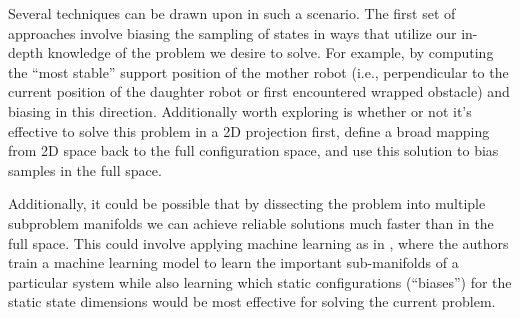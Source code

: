 \documentclass[12pt]{article}
\begin{document}
Several techniques can be drawn upon in such a scenario. The first set of approaches involve biasing the sampling of states 
in ways that utilize our in-depth knowledge of the problem we desire to solve. For example, by computing the ``most stable'' support 
position of the mother robot (i.e., perpendicular to the current position of the daughter robot or first encountered wrapped obstacle) 
and biasing in this direction. Additionally worth exploring is whether or not it's effective to solve this problem in 
a 2D projection first, define a broad mapping from 2D space back to the full configuration space, and use this solution to bias samples
in the full space. 

Additionally, it could be possible that by dissecting the problem into multiple subproblem manifolds we can achieve reliable 
solutions much faster than in the full space. This could involve applying machine learning as in \cite{learning_biases}, where the authors 
train a machine learning model to learn the important sub-manifolds of a particular system while also learning which static 
configurations (``biases'') for the static state dimensions would be most effective for solving the current problem. 









\newpage

\small{}

\end{document}
